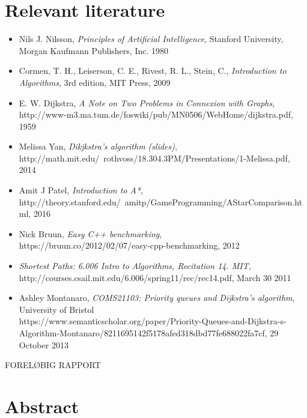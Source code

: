 \documentclass[11pt]{article}
\begin{document}
\section{Relevant literature}
\begin{itemize}
\item Nils J. Nilsson, \textit{Principles of Artificial Intelligence}, Stanford University, Morgan Kaufmann Publishers, Inc. 1980

\item Cormen, T. H., Leiserson, C. E., Rivest, R. L., Stein, C., \textit{Introduction to Algorithms}, 3rd edition, MIT Press, 2009

\item E. W. Dijkstra, \textit{A Note on Two Problems in Connexion with Graphs}, \\ http://www-m3.ma.tum.de/foswiki/pub/MN0506/WebHome/dijkstra.pdf, 1959

\item Melissa Yan, \textit{Dikjkstra's algorithm (slides)}, \\ http://math.mit.edu/~rothvoss/18.304.3PM/Presentations/1-Melissa.pdf, 2014

\item Amit J Patel, \textit{Introduction to A*}, \\ http://theory.stanford.edu/~amitp/GameProgramming/AStarComparison.html, 2016

\item Nick Bruun, \textit{Easy C++ benchmarking}, \\ https://bruun.co/2012/02/07/easy-cpp-benchmarking, 2012

\item \textit{Shortest Paths: 6.006 Intro to Algorithms, Recitation 14. MIT}, \\ http://courses.csail.mit.edu/6.006/spring11/rec/rec14.pdf,  March 30 2011

\item Ashley Montanaro, \textit{COMS21103: Priority queues and Dijkstra’s algorithm}, University of Bristol \\ https://www.semanticscholar.org/paper/Priority-Queues-and-Dijkstra-s-Algorithm-Montanaro/8211695142f5178afed318dbd77fe688022fa7cf, 29 October 2013
\end{itemize}
\newpage
\begin{center}
\Huge{FORELØBIG RAPPORT}
\end{center}
\newpage
\section{Abstract}
\newpage
\tableofcontents
\newpage
\end{document}
